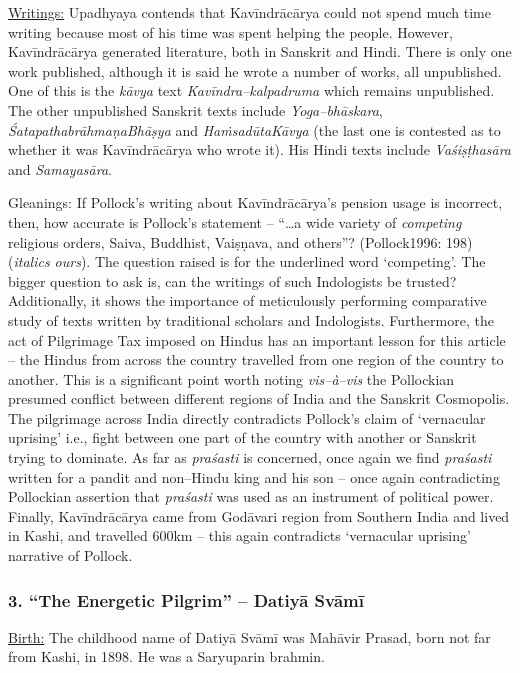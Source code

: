 \underline{Writings:} Upadhyaya contends that Kavīndrācārya could not spend much time writing because most of his time was spent helping the people. However, Kavīndrācārya generated literature, both in Sanskrit and Hindi. There is only one work published, although it is said he wrote a number of works, all unpublished. One of this is the \textit{kāvya} text \textit{Kavīndra–kalpadruma} which remains unpublished. The other unpublished Sanskrit texts include \textit{Yoga–bhāskara}, \textit{ŚatapathabrāhmaṇaBhāṣya} and \textit{HaṁsadūtaKāvya} (the last one is contested as to whether it was Kavīndrācārya who wrote it). His Hindi texts include \textit{Vaśiṣṭhasāra} and \textit{Samayasāra}.

Gleanings: If Pollock’s writing about Kavīndrācārya’s pension usage is incorrect, then, how accurate is Pollock’s statement – “…a wide variety of \textit{competing} religious orders, Saiva, Buddhist, Vaiṣṇava, and others”? (Pollock1996: 198)(\textit{italics ours}). The question raised is for the underlined word ‘competing’. The bigger question to ask is, can the writings of such Indologists be trusted? Additionally, it shows the importance of meticulously performing comparative study of texts written by traditional scholars and Indologists. Furthermore, the act of Pilgrimage Tax imposed on Hindus has an important lesson for this article – the Hindus from across the country travelled from one region of the country to another. This is a significant point worth noting \textit{vis–à–vis} the Pollockian presumed conflict between different regions of India and the Sanskrit Cosmopolis. The pilgrimage across India directly contradicts Pollock’s claim of ‘vernacular uprising’ i.e., fight between one part of the country with another or Sanskrit trying to dominate. As far as \textit{praśasti} is concerned, once again we find \textit{praśasti} written for a pandit and non–Hindu king and his son – once again contradicting Pollockian assertion that \textit{praśasti} was used as an instrument of political power. Finally, Kavīndrācārya came from Godāvari region from Southern India and lived in Kashi, and travelled 600km – this again contradicts ‘vernacular uprising’ narrative of Pollock.


\subsubsection*{3. “The Energetic Pilgrim” – Datiyā Svāmī\protect{}}

\underline{Birth:} The childhood name of Datiyā Svāmī was Mahāvir Prasad, born not far from Kashi, in 1898. He was a Saryuparin brahmin.

